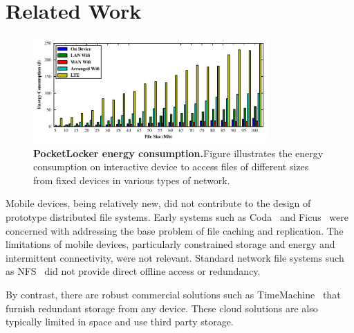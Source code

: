
\section{Related Work}
\label{sec-related}

\begin{figure}[t]
  \centering
  \includegraphics[width=0.8\textwidth]{./figures/energyconsumption.pdf}
  
  \vspace*{-0.1in}

  \caption{\small \textbf{PocketLocker energy consumption.}Figure illustrates the energy
  consumption on interactive device to access files of different sizes from
fixed devices in various types of network.}

  \label{fig-evaluation-energy}
  
  \vspace*{0.05in}


  \vspace*{-0.2in}

\end{figure}
Mobile devices, being relatively new, did not contribute to the design of
prototype distributed file systems.  Early systems such as
Coda~\cite{kistler1992disconnected} and Ficus~\cite{guy1990implementation} were
concerned with addressing the base problem of file caching and replication.
The limitations of mobile devices, particularly constrained storage and energy
and intermittent connectivity, were not relevant.  Standard network file
systems such as NFS~\cite{nowicki1989nfs} did not provide direct offline access
or redundancy.

By contrast, there are robust commercial solutions such as
TimeMachine~\cite{timemachine} that furnish redundant storage from any device.
These cloud solutions are also typically limited in space and use third party
storage.


